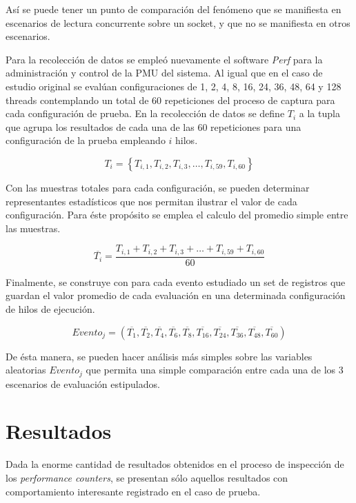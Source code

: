 Así se puede tener un punto de comparación del fenómeno que se manifiesta en escenarios de lectura concurrente sobre un socket, y que no se manifiesta en otros escenarios.

Para la recolección de datos se empleó nuevamente el software \emph{Perf} para la administración y control de la PMU del sistema. Al igual que en el caso de estudio original se evalúan configuraciones de 1, 2, 4, 8, 16, 24, 36, 48, 64 y 128 threads contemplando un total de 60 repeticiones del proceso de captura para cada configuración de prueba. En la recolección de datos se define $T_i$ a la tupla que agrupa los resultados de cada una de las 60 repeticiones para una configuración de la prueba empleando $i$ hilos.

\begin{equation}
\label{eq:tupla1}
T_i = \left\{ T_{i,1},T_{i,2},T_{i,3}, \dots ,T_{i,59}, T_{i,60}\right\} 
\end{equation}

Con las muestras totales para cada configuración, se pueden determinar representantes estadísticos que nos permitan ilustrar el valor de cada configuración. Para éste propósito se emplea el calculo del promedio simple entre las muestras.

\begin{equation}
\label{eq:promedio}
\overline{T_{i}} = \frac{T_{i,1}+T_{i,2}+T_{i,3}+ \dots +T_{i,59}+ T_{i,60}}{60}
\end{equation}

Finalmente, se construye con para cada evento estudiado un set de registros que guardan el valor promedio de cada evaluación en una determinada configuración de hilos de ejecución.

\begin{equation}
\label{eq:tupla2}
Evento_j = \left(\overline{T_{1}}, \overline{T_{2}}, \overline{T_{4}}, \overline{T_{6}}, \overline{T_{8}}, \overline{T_{16}}, \overline{T_{24}}, \overline{T_{36}}, \overline{T_{48}}, \overline{T_{60}}\right)
\end{equation}

De ésta manera, se pueden hacer análisis más simples sobre las variables aleatorias $Evento_j$ que permita una simple comparación entre cada una de los 3 escenarios de evaluación estipulados.

\section{Resultados}
Dada la enorme cantidad de resultados obtenidos en el proceso de inspección de los \emph{performance counters}, se presentan sólo aquellos resultados con comportamiento interesante registrado en el caso de prueba.


